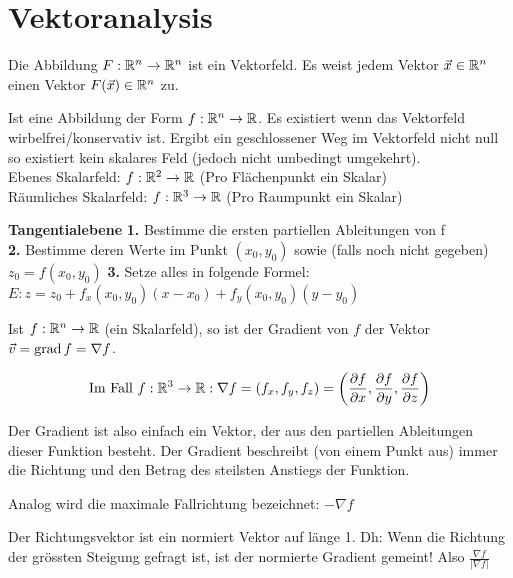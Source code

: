 \section{Vektoranalysis}
\begin{footnotesize}
\begin{definition}[Vektorfeld]
Die Abbildung $F: \mathbb{R}^n \to \mathbb{R}^n$ ist ein Vektorfeld. Es weist jedem
Vektor $\vec{x} \in \mathbb{R}^n$ einen Vektor $F(\vec{x}) \in \mathbb{R}^n$ zu.
\end{definition}

\begin{definition}[Skalarfeld]
Ist eine Abbildung der Form $f: \mathbb{R}^n \to \mathbb{R}$. Es existiert wenn das Vektorfeld wirbelfrei/konservativ ist. Ergibt ein geschlossener Weg im Vektorfeld nicht null so existiert kein skalares Feld (jedoch nicht umbedingt umgekehrt).\\
Ebenes Skalarfeld: $f: \mathbb{R}^2 \to \mathbb{R}$ (Pro Flächenpunkt ein Skalar)\\
Räumliches Skalarfeld: $f: \mathbb{R}^3 \to \mathbb{R}$ (Pro Raumpunkt ein Skalar)
\end{definition}
\textbf{Tangentialebene} \textbf{1.} Bestimme die ersten partiellen Ableitungen von f \\ \textbf{2.} Bestimme deren Werte im Punkt $(x_0, y_0)$ sowie (falls noch nicht gegeben) $z_0 = f(x_0, y_0)$ \textbf{3.} Setze alles in folgende Formel:\\
$E : z = z_0 + f_x(x_0,y_0)(x-x_0) + f_y(x_0,y_0)(y-y_0)$
\end{footnotesize}
\begin{definition}[Gradient]
Ist $f: \mathbb{R}^n \to \mathbb{R}$ (ein Skalarfeld), so ist der Gradient von $f$ der Vektor
$\vec{v} = \operatorname{grad} f = \nabla f$. 

\[
	\text{Im Fall } f: \mathbb{R}^3 \to \mathbb{R}:   \nabla f = (f_x, f_y, f_z) =
	\left( \frac{\partial f}{\partial x}, \frac{\partial f}{\partial y}, \frac{\partial f}{\partial z} \right)
\]

Der Gradient ist also einfach ein Vektor, der aus den partiellen Ableitungen dieser Funktion besteht. Der Gradient beschreibt (von einem Punkt aus) immer die Richtung und den Betrag des steilsten Anstiegs der Funktion. 

Analog wird die maximale Fallrichtung bezeichnet: $- \nabla f$
\end{definition}

\begin{definition}[Richtungsvektor] Der Richtungsvektor ist ein normiert Vektor auf länge 1. Dh: Wenn die Richtung der grössten Steigung gefragt ist, ist der normierte Gradient gemeint! Also $\frac{\nabla f}{|\nabla f|}$
\end{definition}

